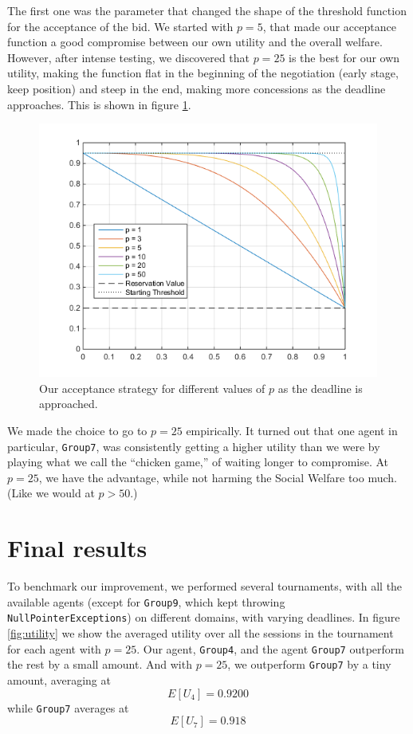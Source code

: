 \documentclass[a4,11pt]{scrartcl}
\begin{document}
The first one was the parameter that changed the shape of the threshold function for the acceptance of the bid. We started with $p=5$, that made our acceptance function a good compromise between our own utility and the overall welfare. However, after intense testing, we discovered that $p=25$ is the best for our own utility, making the function flat in the beginning of the negotiation (early stage, keep position) and steep in the end, making more concessions as the deadline approaches. This is shown in figure \ref{fig:chicken}.
\label{sec:improvements}
\begin{figure}[ht]
    \centering
    \includegraphics[width=\textwidth]{chicken.png}
    \caption{Our acceptance strategy for different values of $p$ as the deadline is approached.}
    \label{fig:chicken}
\end{figure}

We made the choice to go to $p=25$ empirically. It turned out that one agent in particular, \verb|Group7|, was consistently getting a higher utility than we were by playing what we call the ``chicken game,'' of waiting longer to compromise. At $p=25$, we have the advantage, while not harming the Social Welfare too much. (Like we would at $p>50$.)


\section{Final results}

To benchmark our improvement, we performed several tournaments, with all 
the available agents (except for \verb|Group9|, which kept throwing 
\verb|NullPointerExceptions|) on different domains, 
with 
varying deadlines. In figure \ref{fig:utility} we show the averaged utility over all the sessions in the tournament for each agent with $p=25$. Our agent, \verb|Group4|, and the agent \verb|Group7| outperform the rest by a small amount. And with $p=25$, we outperform \verb|Group7| by a tiny amount, averaging at $$E[U_{4}]=0.9200$$ while \verb|Group7| averages at $$E[U_{7}]=0.918$$
\end{document}
